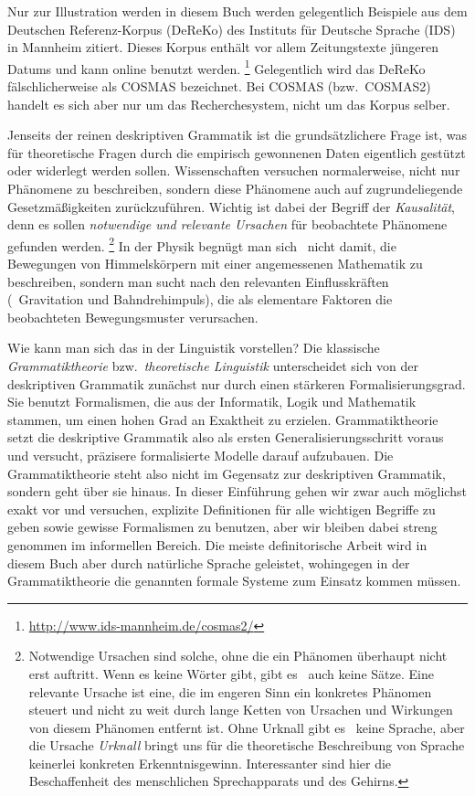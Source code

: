 Nur zur Illustration werden in diesem Buch werden gelegentlich Beispiele aus dem Deutschen Referenz-Korpus (DeReKo) des Instituts für Deutsche Sprache (IDS) in Mannheim zitiert.
Dieses Korpus enthält vor allem Zeitungstexte jüngeren Datums und kann online benutzt werden.%
\footnote{\url{http://www.ids-mannheim.de/cosmas2/}}
Gelegentlich wird das DeReKo fälschlicherweise als COSMAS bezeichnet.
Bei COSMAS (bzw.\ COSMAS2) handelt es sich aber nur um das Recherchesystem, nicht um das Korpus selber.


Jenseits der reinen deskriptiven Grammatik ist die grundsätzlichere Frage ist, was für theoretische Fragen durch die empirisch gewonnenen Daten eigentlich gestützt oder widerlegt werden sollen.
Wissenschaften versuchen normalerweise, nicht nur Phänomene zu beschreiben, sondern diese Phänomene auch auf zugrundeliegende Gesetzmäßigkeiten zurückzuführen.
Wichtig ist dabei der Begriff der \textit{Kausalität}, denn es sollen \textit{notwendige und relevante Ursachen} für beobachtete Phänomene gefunden werden.%
\footnote{Notwendige Ursachen sind solche, ohne die ein Phänomen überhaupt nicht erst auftritt.
Wenn es keine Wörter gibt, gibt es \zB\ auch keine Sätze.
Eine relevante Ursache ist eine, die im engeren Sinn ein konkretes Phänomen steuert und nicht zu weit durch lange Ketten von Ursachen und Wirkungen von diesem Phänomen entfernt ist.
Ohne Urknall gibt es \zB\ keine Sprache, aber die Ursache \textit{Urknall} bringt uns für die theoretische Beschreibung von Sprache keinerlei konkreten Erkenntnisgewinn.
Interessanter sind hier die Beschaffenheit des menschlichen Sprechapparats und des Gehirns.}
In der Physik begnügt man sich \zB\ nicht damit, die Bewegungen von Himmelskörpern mit einer angemessenen Mathematik zu beschreiben, sondern man sucht nach den relevanten Einflusskräften (\zB\ Gravitation und Bahndrehimpuls), die als elementare Faktoren die beobachteten Bewegungsmuster verursachen.

Wie kann man sich das in der Linguistik vorstellen?
Die klassische \textit{Grammatiktheorie} bzw.\ \textit{theoretische Linguistik} unterscheidet sich von der deskriptiven Grammatik zunächst nur durch einen stärkeren Formalisierungsgrad.
Sie benutzt Formalismen, die aus der Informatik, Logik und Mathematik stammen, um einen hohen Grad an Exaktheit zu erzielen.
Grammatiktheorie setzt die deskriptive Grammatik also als ersten Generalisierungsschritt voraus und versucht, präzisere formalisierte Modelle darauf aufzubauen.
Die Grammatiktheorie steht also nicht im Gegensatz zur deskriptiven Grammatik, sondern geht über sie hinaus.
In dieser Einführung gehen wir zwar auch möglichst exakt vor und versuchen, explizite Definitionen für alle wichtigen Begriffe zu geben sowie gewisse Formalismen zu benutzen, aber wir bleiben dabei streng genommen im informellen Bereich.
Die meiste definitorische Arbeit wird in diesem Buch aber durch natürliche Sprache geleistet, wohingegen in der Grammatiktheorie die genannten formale Systeme zum Einsatz kommen müssen.

